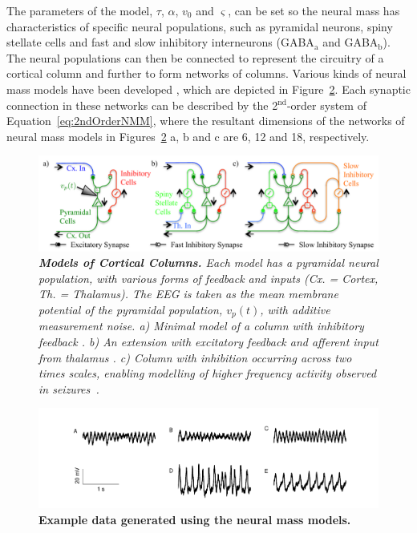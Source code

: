 \documentclass{article}
\begin{document}
The parameters of the model, $\tau$, $\alpha$, $v_0$ and $\varsigma$, can be set so the neural mass has characteristics of specific neural populations, such as pyramidal neurons, spiny stellate cells and fast and slow inhibitory interneurons (GABA$_\mathrm{a}$ and GABA$_\mathrm{b}$). The neural populations can then be connected to represent the circuitry of a cortical column and further to form networks of columns. Various kinds of neural mass models have been developed \cite{Silva1974,Jansen1995,Wendling2002,David2003}, which are depicted in Figure~\ref{fig:NMMs}. Each synaptic connection in these networks can be described by the 2$^{\mathrm{nd}}$-order system of Equation~\ref{eq:2ndOrderNMM}, where the resultant dimensions of the networks of neural mass models in Figures~\ref{fig:NMMs} a, b and c are 6, 12 and 18, respectively.
\begin{figure}[ht]
	\centering
		\includegraphics[scale=1]{./figures/pdf/NeuralMassesHoriz.pdf}
	\caption{\emph{\textbf{Models of Cortical Columns.} Each model has a pyramidal neural population, with various forms of feedback and inputs (Cx. = Cortex, Th. = Thalamus). The EEG is taken as the mean membrane potential of the pyramidal population, $v_p(t)$, with additive measurement noise.  a) Minimal model of a column with inhibitory feedback \cite{Silva1974}. b) An extension with excitatory feedback and afferent input from thalamus \cite{Jansen1995,David2003}. c) Column with inhibition occurring across two times scales, enabling modelling of higher frequency activity observed in seizures~\cite{Wendling2002}.}}
	\label{fig:NMMs}
\end{figure}

\begin{figure}[ht]
	\centering
		\includegraphics[scale=1]{./figures/pdf/Example_Data.pdf}
		\caption{\textbf{Example data generated using the neural mass models.}}
	\label{fig:NMMs}
\end{figure}
\end{document}
